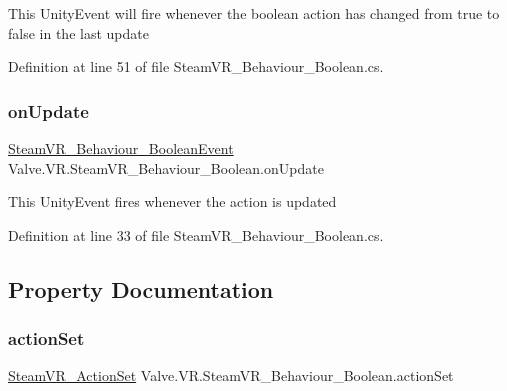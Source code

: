 This Unity\+Event will fire whenever the boolean action has changed from true to false in the last update 



Definition at line 51 of file Steam\+V\+R\+\_\+\+Behaviour\+\_\+\+Boolean.\+cs.

\mbox{\label{class_valve_1_1_v_r_1_1_steam_v_r___behaviour___boolean_ab7d0f9440d0b7c1f3df9cd7b21dd8104}} 
\subsubsection{\texorpdfstring{onUpdate}{onUpdate}}
{\footnotesize\ttfamily \mbox{\hyperlink{class_valve_1_1_v_r_1_1_steam_v_r___behaviour___boolean_event}{Steam\+V\+R\+\_\+\+Behaviour\+\_\+\+Boolean\+Event}} Valve.\+V\+R.\+Steam\+V\+R\+\_\+\+Behaviour\+\_\+\+Boolean.\+on\+Update}



This Unity\+Event fires whenever the action is updated 



Definition at line 33 of file Steam\+V\+R\+\_\+\+Behaviour\+\_\+\+Boolean.\+cs.



\subsection{Property Documentation}
\mbox{\label{class_valve_1_1_v_r_1_1_steam_v_r___behaviour___boolean_ab6787ffad27bdf7cdf30d0b63c96c8c0}} 
\subsubsection{\texorpdfstring{actionSet}{actionSet}}
{\footnotesize\ttfamily \mbox{\hyperlink{class_valve_1_1_v_r_1_1_steam_v_r___action_set}{Steam\+V\+R\+\_\+\+Action\+Set}} Valve.\+V\+R.\+Steam\+V\+R\+\_\+\+Behaviour\+\_\+\+Boolean.\+action\+Set\hspace{0.3cm}{\ttfamily [get]}}



